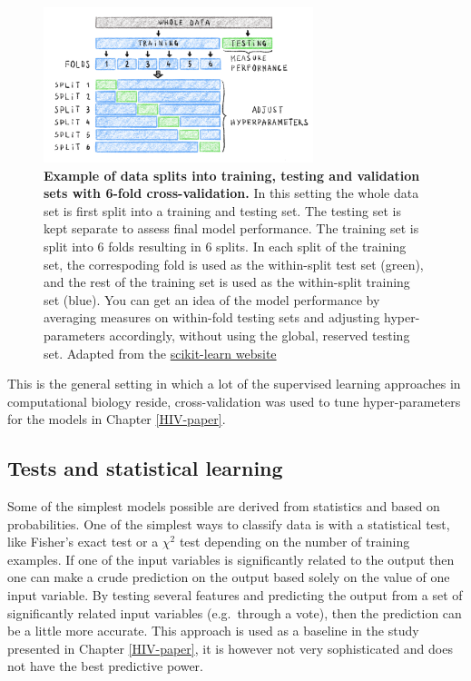 \documentclass[
  11pt,
  twoside,
  BCOR=10mm,
  listof=totoc]{scrbook}
\newcommand{\extcaption}[2]{
    \caption[#1]{
        \textbf{#1}\newline
        #2
    }
}
\begin{document}
\begin{figure}
\centering
\includegraphics[width=0.7\textwidth]{figures/Encode-seqs/Cross-validation.png}
\extcaption{Example of data splits into training, testing and validation sets with 6-fold cross-validation.}{In this setting the whole data set is first split into a training and testing set. The testing set is kept separate to assess final model performance. The training set is split into 6 folds resulting in 6 splits. In each split of the training set, the correspoding fold is used as the within-split test set (green), and the rest of the training set is used as the within-split training set (blue). You can get an idea of the model performance by averaging measures on within-fold testing sets and adjusting hyper-parameters accordingly, without using the global, reserved testing set. Adapted from the \href{https://scikit-learn.org/stable/modules/cross_validation.html}{scikit-learn website}}
\label{fig:crossValidation}
\end{figure}

This is the general setting in which a lot of the supervised learning approaches in computational biology reside, cross-validation was used to tune hyper-parameters for the models in Chapter \ref{HIV-paper}.

\hypertarget{tests-and-statistical-learning}{%
\subsection{Tests and statistical learning}\label{tests-and-statistical-learning}}

Some of the simplest models possible are derived from statistics and based on probabilities. One of the simplest ways to classify data is with a statistical test, like Fisher's exact test \autocite{fisherInterpretationH2Contingency1922} or a \(\chi^2\) test \autocite{pearsonCriterionThatGiven1900} depending on the number of training examples. If one of the input variables is significantly related to the output then one can make a crude prediction on the output based solely on the value of one input variable. By testing several features and predicting the output from a set of significantly related input variables (e.g.~through a vote), then the prediction can be a little more accurate. This approach is used as a baseline in the study presented in Chapter \ref{HIV-paper}, it is however not very sophisticated and does not have the best predictive power.
\end{document}
